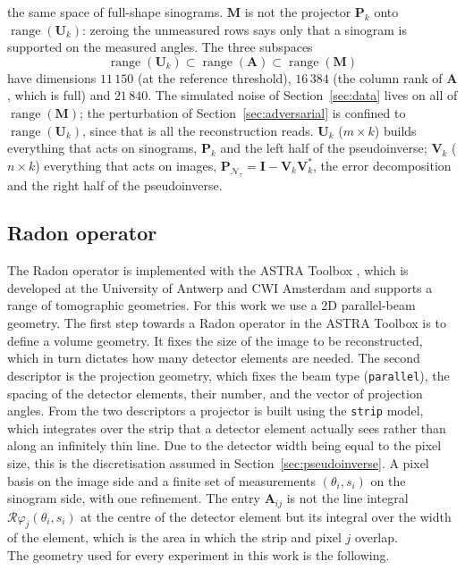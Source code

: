 \documentclass{article}
\numberwithin{equation}{section}
\begin{document}
the same space of full-shape sinograms. $\mathbf{M}$ is not the projector $\mathbf{P}_k$ onto
$\operatorname{range}(\mathbf{U}_k)$: zeroing the unmeasured rows says only that a sinogram is supported on
the measured angles. The three subspaces
\[\operatorname{range}(\mathbf{U}_k)\subset \operatorname{range}(\mathbf{A})\subset\operatorname{range}(\mathbf{M})\]
have dimensions $11\,150$ (at the reference threshold), $16\,384$ (the column rank of $\mathbf{A}$, which is
full) and $21\,840$. The simulated noise of Section~\ref{sec:data} lives on all of
$\operatorname{range}(\mathbf{M})$; the perturbation of Section~\ref{sec:adversarial} is confined to
$\operatorname{range}(\mathbf{U}_k)$, since that is all the reconstruction reads. $\mathbf{U}_k$
($m\times k$) builds everything that acts on sinograms, $\mathbf{P}_k$ and the left half of the
pseudoinverse; $\mathbf{V}_k$ ($n\times k$) everything that acts on images,
$\mathbf{P}_{\mathcal{N}_\tau}=\mathbf{I}-\mathbf{V}_k\mathbf{V}_k^{*}$, the error decomposition and the
right half of the pseudoinverse.\\
\subsection{Radon operator}\label{sec:radon}
The Radon operator is implemented with the ASTRA Toolbox \parencite{Astra},
which is developed at the University of Antwerp and CWI Amsterdam and supports a range of tomographic geometries.
For this work we use a 2D parallel-beam geometry.
The first step towards a Radon operator in the ASTRA Toolbox is to define a volume geometry.
It fixes the size of the image to be reconstructed, which in turn dictates how many detector elements are needed.
The second descriptor is the projection geometry, which fixes the beam type
(\texttt{parallel}), the spacing of the detector elements, their number, and the
vector of projection angles. From the two descriptors a projector is built using
the \texttt{strip} model, which integrates over the strip that a detector
element actually sees rather than along an infinitely thin line. Due to the detector width being equal to the pixel size, this is the
discretisation assumed in Section~\ref{sec:pseudoinverse}. A pixel basis on the image
side and a finite set of measurements $(\theta_i,s_i)$ on the sinogram side, with one refinement.
The entry $\mathbf{A}_{ij}$ is not the line integral $\mathcal{R}\varphi_j(\theta_i,s_i)$ at the centre of the
detector element but its integral over the width of the element, which is the area in which the strip and pixel $j$ overlap.\\
The geometry used for every experiment in this work is the following.
\end{document}

